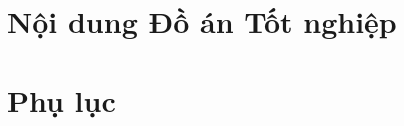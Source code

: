 \documentclass[12pt,a4paper]{report}
\begin{document}
    
    \clearpage
    \thispagestyle{empty}
    \mbox{}
    \clearpage
    
    
    
    
    \tableofcontents
    \listoftables
    \listoffigures




    \part{Nội dung Đồ án Tốt nghiệp}
        
        
        
        
        
        
        

    \part{Phụ lục}
        \appendix
        
        
          






    \nocite{*}
    \newpage
    
    
\end{document}
